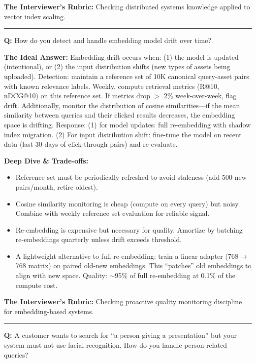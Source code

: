 \textbf{The Interviewer's Rubric:} Checking distributed systems knowledge applied to vector index scaling.

\bigskip\hrule\bigskip

\textbf{Q:} How do you detect and handle embedding model drift over time?

\textbf{The Ideal Answer:} Embedding drift occurs when: (1) the model is updated (intentional), or (2) the input distribution shifts (new types of assets being uploaded). Detection: maintain a reference set of 10K canonical query-asset pairs with known relevance labels. Weekly, compute retrieval metrics (R@10, nDCG@10) on this reference set. If metrics drop $>$ 2\% week-over-week, flag drift. Additionally, monitor the distribution of cosine similarities---if the mean similarity between queries and their clicked results decreases, the embedding space is drifting. Response: (1) for model updates: full re-embedding with shadow index migration. (2) For input distribution shift: fine-tune the model on recent data (last 30 days of click-through pairs) and re-evaluate.

\textbf{Deep Dive \& Trade-offs:}
\begin{itemize}
  \item Reference set must be periodically refreshed to avoid staleness (add 500 new pairs/month, retire oldest).
  \item Cosine similarity monitoring is cheap (compute on every query) but noisy. Combine with weekly reference set evaluation for reliable signal.
  \item Re-embedding is expensive but necessary for quality. Amortize by batching re-embeddings quarterly unless drift exceeds threshold.
  \item A lightweight alternative to full re-embedding: train a linear adapter (768$\rightarrow$768 matrix) on paired old-new embeddings. This ``patches'' old embeddings to align with new space. Quality: $\sim$95\% of full re-embedding at 0.1\% of the compute cost.
\end{itemize}

\textbf{The Interviewer's Rubric:} Checking proactive quality monitoring discipline for embedding-based systems.

\bigskip\hrule\bigskip

\textbf{Q:} A customer wants to search for ``a person giving a presentation'' but your system must not use facial recognition. How do you handle person-related queries?

